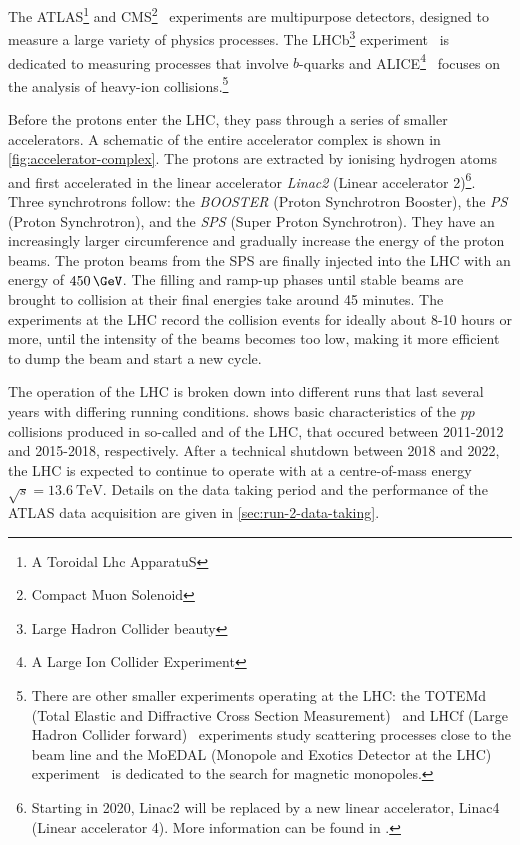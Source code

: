 The ATLAS\footnote{A Toroidal Lhc ApparatuS} and CMS\footnote{Compact Muon Solenoid}~\cite{CMS-TDR-08-001} experiments are multipurpose detectors, designed to measure a large variety of physics processes. The LHCb\footnote{Large Hadron Collider beauty} experiment~\cite{1748-0221-3-08-S08005} is dedicated to measuring processes that involve $b$-quarks and ALICE\footnote{A Large Ion Collider Experiment}~\cite{1748-0221-3-08-S08002} focuses on the analysis of heavy-ion collisions.\footnote{There are other smaller experiments operating at the LHC: the TOTEMd (Total Elastic and Diffractive Cross Section Measurement)~\cite{1748-0221-3-08-S08007} and LHCf (Large Hadron Collider forward)~\cite{1748-0221-3-08-S08006} experiments study scattering processes close to the beam line and the MoEDAL (Monopole and Exotics Detector at the LHC) experiment~\cite{1742-6596-631-1-012014} is dedicated to the search for magnetic monopoles.}

Before the protons enter the LHC, they pass through a series of smaller accelerators. A schematic of the entire accelerator complex is shown in \cref{fig:accelerator-complex}.
The protons are extracted by ionising hydrogen atoms and first accelerated in the linear accelerator \emph{Linac2} (Linear accelerator 2)\footnote{Starting in 2020, Linac2 will be replaced by a new linear accelerator, Linac4 (Linear accelerator 4). More information can be found in .}. Three synchrotrons follow: the \emph{BOOSTER} (Proton Synchrotron Booster), the \emph{PS} (Proton Synchrotron), and the \emph{SPS} (Super Proton Synchrotron).
They have an increasingly larger circumference and gradually increase the energy of the proton beams.
The proton beams from the SPS are finally injected into the LHC with an energy of $450\,\GeV$. The filling and ramp-up phases until stable beams are brought to collision at their final energies take around 45 minutes. The experiments at the LHC record the collision events for ideally about 8-10 hours or more, until the intensity of the beams becomes too low, making it more efficient to dump the beam and start a new cycle.

The operation of the LHC is broken down into different runs that last several years with differing running conditions.
 shows basic characteristics of the $pp$ collisions produced in so-called \RunOne and \RunTwo of the LHC, that occured between 2011-2012 and 2015-2018, respectively. After a technical shutdown between 2018 and 2022, the LHC is expected to continue to operate with \RunThr at a centre-of-mass energy  $\sqrt{s} = \SI{13.6}{\TeV}$.
Details on the \RunTwo data taking period and the performance of the ATLAS data acquisition are given in \cref{sec:run-2-data-taking}.

